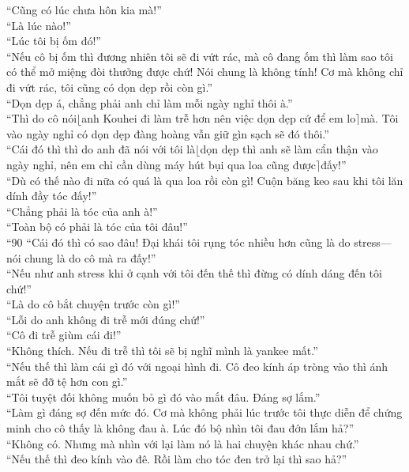\documentclass[12pt,a4paper, twosides]{book}
\begin{document}
“Cũng có lúc chưa hôn kia mà!”\\
“Là lúc nào!”\\
“Lúc tôi bị ốm đó!”\\
“Nếu cô bị ốm thì đương nhiên tôi sẽ đi vứt rác, mà cô đang ốm thì làm sao tôi có thể mở miệng đòi thưởng được chứ! Nói chung là không tính! Cơ mà không chỉ đi vứt rác, tôi cũng có dọn dẹp rồi còn gì.”\\
“Dọn dẹp á, chẳng phải anh chỉ làm mỗi ngày nghỉ thôi à.”\\
“Thì do cô nói$\lfloor$anh Kouhei đi làm trễ hơn nên việc dọn dẹp cứ để em lo$\rceil$mà. Tôi vào ngày nghỉ có dọn dẹp đàng hoàng vẫn giữ gìn sạch sẽ đó thôi.”\\
“Cái đó thì thì do anh đã nói với tôi là$\lfloor$dọn dẹp thì anh sẽ làm cẩn thận vào ngày nghỉ, nên em chỉ cần dùng máy hút bụi qua loa cũng được$\rceil$đấy!”\\
“Dù có thế nào đi nữa có quá là qua loa rồi còn gì! Cuộn băng keo sau khi tôi lăn dính đầy tóc đấy!”\\
“Chẳng phải là tóc của anh à!”\\
“Toàn bộ có phải là tóc của tôi đâu!”\\
“90%
“Cái đó thì có sao đâu! Đại khái tôi rụng tóc nhiều hơn cũng là do stress—nói chung là do cô mà ra đấy!”\\
“Nếu như anh stress khi ở cạnh với tôi đến thế thì đừng có dính dáng đến tôi chứ!”\\
“Là do cô bắt chuyện trước còn gì!”\\
“Lỗi do anh không đi trễ mới đúng chứ!”\\
“Cô đi trễ giùm cái đi!”\\
“Không thích. Nếu đi trễ thì tôi sẽ bị nghĩ mình là yankee mất.”\\
“Nếu thế thì làm cái gì đó với ngoại hình đi. Cô đeo kính áp tròng vào thì ánh mắt sẽ đỡ tệ hơn con gì.”\\
“Tôi tuyệt đối không muốn bỏ gì đó vào mắt đâu. Đáng sợ lắm.”\\
“Làm gì đáng sợ đến mức đó. Cơ mà không phải lúc trước tôi thực diễn để chứng minh cho cô thấy là không đau à. Lúc đó bộ nhìn tôi đau đớn lắm hả?”\\
“Không có. Nhưng mà nhìn với lại làm nó là hai chuyện khác nhau chứ.”\\
“Nếu thế thì đeo kính vào đê. Rồi làm cho tóc đen trở lại thì sao hả?”\\
\end{document}
